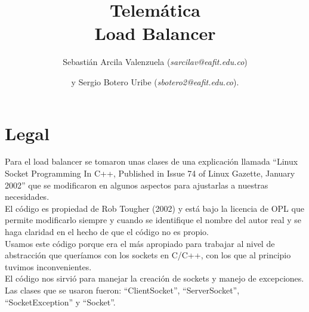 \documentclass[
	final,
	notitlepage,
	narroweqnarray,
	inline,
	twoside,
	]{ieee}
\begin{document}
\title[Load Balancer]{
       Telemática\\ Load Balancer}


\author[]{Sebastián Arcila Valenzuela (\textit{sarcilav@eafit.edu.co})
\and{}y Sergio Botero Uribe (\textit{sbotero2@eafit.edu.co}).
}

\titletext{, \today}
\maketitle               


\section{Legal}

Para el load balancer se tomaron unas clases de una explicación llamada ``Linux Socket Programming In C++, Published in Issue 74 of Linux Gazette, January 2002''  \cite{web} que se modificaron en algunos aspectos para ajustarlas a nuestras necesidades.\\
El código es propiedad de Rob Tougher (2002)\cite{mail} y está bajo la licencia de OPL \cite{opl} que permite modificarlo siempre y cuando se identifique el nombre del autor real y se haga claridad en el hecho de que el código no es propio.\\
Usamos este código porque era el más apropiado para trabajar al nivel de abstracción que queríamos con los sockets en C/C++, con los que al
principio tuvimos inconvenientes.\\ El código nos sirvió para manejar la creación de sockets y manejo de excepciones.\\
Las clases que se usaron fueron: ``ClientSocket'', ``ServerSocket'', ``SocketException'' y ``Socket''.

\begin{thebibliography}{1}


\\
\\
\\

\end{thebibliography}
\end{document}
